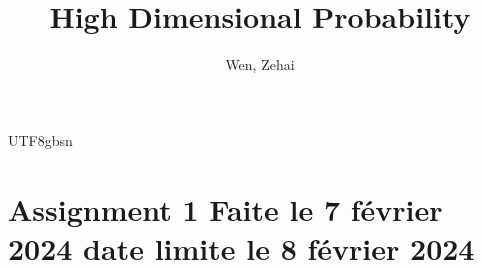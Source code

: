 \documentclass[12pt]{report}
\title{High Dimensional Probability}
\author{Wen, Zehai}
\date{\DTMnow}
\theoremstyle{plain}
\theoremstyle{definition}
\begin{document}
\begin{CJK*}{UTF8}{gbsn}
\maketitle

\setcounter{tocdepth}{0}
\tableofcontents

\chapter{Assignment 1 Faite le 7 février 2024 date limite le 8 février 2024}


%

%

%

\end{CJK*}
\end{document}
